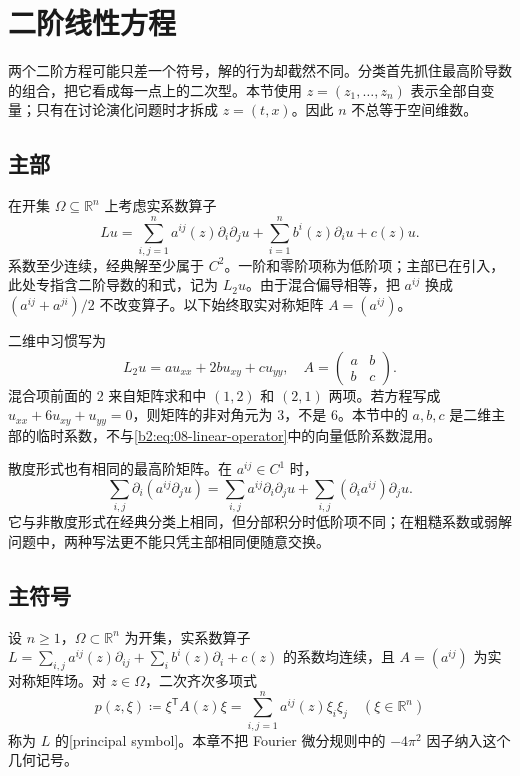 \section{二阶线性方程}
\label{b2:sec:0801}

两个二阶方程可能只差一个符号，解的行为却截然不同。分类首先抓住最高阶导数的组合，把它看成每一点上的二次型。本节使用 \(z=(z_1,\ldots,z_n)\) 表示全部自变量；只有在讨论演化问题时才拆成 \(z=(t,x)\)。因此 \(n\) 不总等于空间维数。

\subsection{主部}
\label{b2:subsec:080101}

在开集 \(\Omega\subseteq\mathbb R^n\) 上考虑实系数算子
\begin{equation}\label{b2:eq:08-linear-operator}
 Lu=\sum_{i,j=1}^n a^{ij}(z)\partial_i\partial_ju
 +\sum_{i=1}^n b^i(z)\partial_i u+c(z)u.
\end{equation}
系数至少连续，经典解至少属于 \(C^2\)。一阶和零阶项称为低阶项；主部已在引入，此处专指含二阶导数的和式，记为 \(L_2u\)。由于混合偏导相等，把 \(a^{ij}\) 换成 \((a^{ij}+a^{ji})/2\) 不改变算子。以下始终取实对称矩阵 \(A=(a^{ij})\)。

\ProseParagraphBreak

二维中习惯写为
\[
 L_2u=a u_{xx}+2b u_{xy}+c u_{yy},\quad
 A=\begin{pmatrix}a&b\\b&c\end{pmatrix}.
\]
混合项前面的 \(2\) 来自矩阵求和中 \((1,2)\) 和 \((2,1)\) 两项。若方程写成 \(u_{xx}+6u_{xy}+u_{yy}=0\)，则矩阵的非对角元为 \(3\)，不是 \(6\)。本节中的 \(a,b,c\) 是二维主部的临时系数，不与\eqref{b2:eq:08-linear-operator}中的向量低阶系数混用。

\ProseParagraphBreak

散度形式也有相同的最高阶矩阵。在 \(a^{ij}\in C^1\) 时，
\[
 \sum_{i,j}\partial_i(a^{ij}\partial_ju)
 =\sum_{i,j}a^{ij}\partial_i\partial_ju
 +\sum_{i,j}(\partial_i a^{ij})\partial_ju.
\]
它与非散度形式在经典分类上相同，但分部积分时低阶项不同；在粗糙系数或弱解问题中，两种写法更不能只凭主部相同便随意交换。

\subsection{主符号}
\label{b2:subsec:080102}

\begin{definition}\label{b2:def:08-principal-symbol}
设 \(n\geq1\)，\(\Omega\subset\mathbb R^n\) 为开集，实系数算子 \(L=\sum_{i,j}a^{ij}(z)\partial_{ij}+\sum_i b^i(z)\partial_i+c(z)\) 的系数均连续，且 \(A=(a^{ij})\) 为实对称矩阵场。对 \(z\in\Omega\)，二次齐次多项式
\[
 p(z,\xi)\coloneqq\xi^{\mathsf T}A(z)\xi
 =\sum_{i,j=1}^n a^{ij}(z)\xi_i\xi_j
 \quad(\xi\in\mathbb R^n)
\]
称为 \(L\) 的[principal symbol]。本章不把 Fourier 微分规则中的 \(-4\pi^2\) 因子纳入这个几何记号。
\end{definition}

